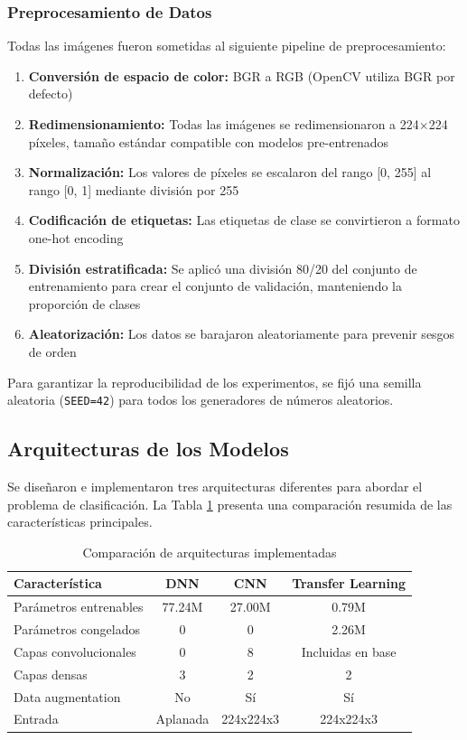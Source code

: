 \documentclass[11pt, a4paper]{article}
\begin{document}
\subsubsection{Preprocesamiento de Datos}

Todas las imágenes fueron sometidas al siguiente pipeline de preprocesamiento:

\begin{enumerate}
    \item \textbf{Conversión de espacio de color:} BGR a RGB (OpenCV utiliza BGR por defecto)
    \item \textbf{Redimensionamiento:} Todas las imágenes se redimensionaron a 224$\times$224 píxeles, tamaño estándar compatible con modelos pre-entrenados
    \item \textbf{Normalización:} Los valores de píxeles se escalaron del rango [0, 255] al rango [0, 1] mediante división por 255
    \item \textbf{Codificación de etiquetas:} Las etiquetas de clase se convirtieron a formato one-hot encoding
    \item \textbf{División estratificada:} Se aplicó una división 80/20 del conjunto de entrenamiento para crear el conjunto de validación, manteniendo la proporción de clases
    \item \textbf{Aleatorización:} Los datos se barajaron aleatoriamente para prevenir sesgos de orden
\end{enumerate}

Para garantizar la reproducibilidad de los experimentos, se fijó una semilla aleatoria (\texttt{SEED=42}) para todos los generadores de números aleatorios.

\subsection{Arquitecturas de los Modelos}

Se diseñaron e implementaron tres arquitecturas diferentes para abordar el problema de clasificación. La Tabla \ref{tab:arquitecturas} presenta una comparación resumida de las características principales.

\begin{table}[H]
\centering
\caption{Comparación de arquitecturas implementadas}
\label{tab:arquitecturas}
\begin{tabular}{@{}lccc@{}}
\toprule
\textbf{Característica} & \textbf{DNN} & \textbf{CNN} & \textbf{Transfer Learning} \\
\midrule
Parámetros entrenables  & 77.24M       & 27.00M       & 0.79M \\
Parámetros congelados   & 0            & 0            & 2.26M \\
Capas convolucionales   & 0            & 8            & Incluidas en base \\
Capas densas            & 3            & 2            & 2 \\
Data augmentation       & No           & Sí           & Sí \\
Entrada                 & Aplanada     & 224x224x3    & 224x224x3 \\
\bottomrule
\end{tabular}
\end{table}
\end{document}
